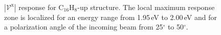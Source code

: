 \documentclass[prb,11pt,tightenlines,twocolumn,aps]{revtex4-1}
\begin{document}
\begin{figure}[tb]
    \centering
    \\
    \caption{$|\mathcal{V}^{\mathrm{x}}|$ response for C$_{16}$H$_{8}$-up
    structure. The local maximum response zone is localized for an energy range
    from 1.95\,eV to 2.00\,eV and for a polarization angle of the incoming beam
    from 25$^{\circ}$ to 50$^{\circ}$.}
    \label{fig:up-vab-mag-2}
\end{figure}
\end{document}
